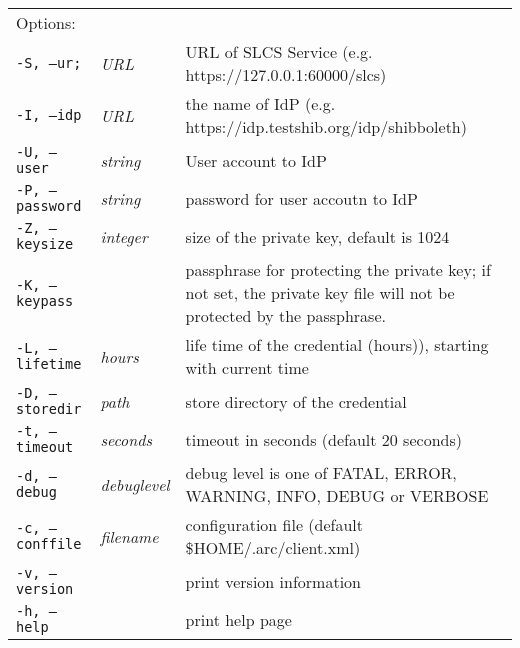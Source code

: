 \hspace*{0.5cm}
\begin{shaded}
\end{shaded}
\begin{longtable}{llp{8cm}}
   Options:&&\\
   \texttt{-S, --ur;}& \textit{URL} & URL of SLCS Service (e.g. https://127.0.0.1:60000/slcs)\\
   \texttt{-I, --idp}& \textit{URL} & the name of IdP (e.g. https://idp.testshib.org/idp/shibboleth)\\
   \texttt{-U, --user}& \textit{string} & User account to IdP\\
   \texttt{-P, --password}& \textit{string} & password for user accoutn to IdP\\
   \texttt{-Z, --keysize}& \textit{integer} & size of the private key, default is 1024\\
   \texttt{-K, --keypass}& \textit{} & passphrase for protecting the private key; if not set, the private key file will not be protected by the passphrase.\\
   \texttt{-L, --lifetime}& \textit{hours} & life time of the credential (hours)), starting with current time\\
   \texttt{-D, --storedir}& \textit{path} & store directory of the credential\\
   \texttt{-t, --timeout}& \textit{seconds} & timeout in seconds (default 20 seconds)\\
   \texttt{-d, --debug}& \textit{debuglevel}&debug level is one of  FATAL, ERROR, WARNING, INFO, DEBUG or VERBOSE\\
   \texttt{-c, --conffile}&\textit{filename}& configuration file (default {\$}HOME/.arc/client.xml)\\
   \texttt{-v, --version}& & print version information\\
   \texttt{-h, --help}& & print help page\\
\end{longtable}
